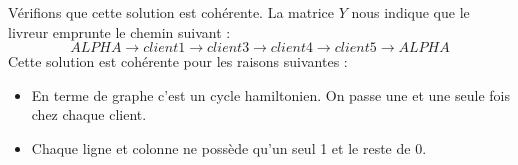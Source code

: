 Vérifions que cette solution est cohérente.
La matrice $Y$ nous indique que le livreur emprunte le chemin suivant : \\
$$ALPHA \rightarrow client1 \rightarrow client3 \rightarrow client4 \rightarrow client5 \rightarrow ALPHA $$
Cette solution est cohérente pour les raisons suivantes :
\begin{itemize}
\item En terme de graphe c'est un cycle hamiltonien. On passe une et une seule fois chez chaque client.
\item Chaque ligne et colonne ne possède qu'un seul 1 et le reste de 0.
\end{itemize}



